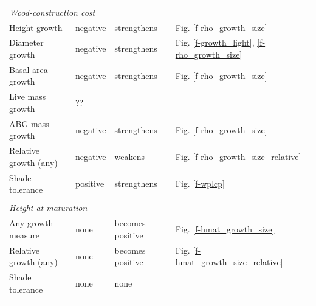\documentclass[12pt, a4paper]{article}
\begin{document}
\begin{table}[h]
{\begin{tabular}{p{4cm}p{2.5cm}p{3.5cm}p{6cm}}
\multicolumn{4}{l}{\emph{Wood-construction cost}} \\

Height growth & negative & strengthens  & Fig. \ref{f-rho_growth_size}\\
Diameter growth & negative & strengthens & Fig. \ref{f-growth_light}, \ref{f-rho_growth_size} \\
Basal area growth & negative & strengthens & Fig. \ref{f-rho_growth_size} \\
Live mass growth & ??  & & \\
ABG mass growth & negative & strengthens & Fig. \ref{f-rho_growth_size}\\
Relative growth (any) & negative & weakens & Fig. \ref{f-rho_growth_size_relative}\\
Shade tolerance & positive &  strengthens & Fig. \ref{f-wplcp}\\ \\

\multicolumn{4}{l}{\emph{Height at maturation}} \\
Any growth measure & none & becomes positive  & Fig. \ref{f-hmat_growth_size}\\
Relative growth (any) & none & becomes positive  & Fig. \ref{f-hmat_growth_size_relative}\\
Shade tolerance & none &  none &  \\  \\ \hline
\end{tabular}
}
\label{tab:predictions}
\end{table}

\newpage
\end{document}
